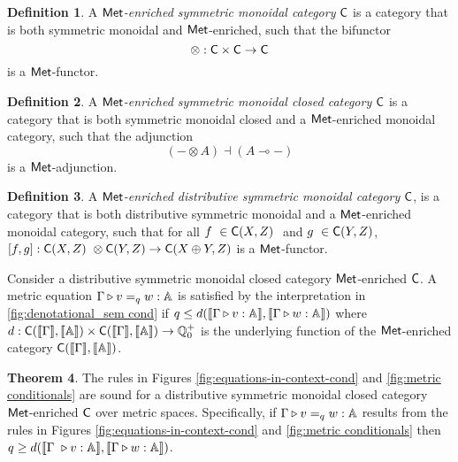 \documentclass[10pt,a4paper]{amsart}
\theoremstyle{definition}
\newtheorem{definition}{Definition}[section]
\theoremstyle{definition}
\theoremstyle{definition}
\theoremstyle{definition}
\theoremstyle{definition}
\theoremstyle{definition}
\newtheorem{theorem}[definition]{Theorem}
\begin{document}
\begin{definition}
A \emph{$\mathsf{Met}$-enriched symmetric monoidal category} $\mathsf{C}$ is a category that is both symmetric monoidal and $\mathsf{Met}$-enriched, such that the bifunctor
\[
\otimes : \mathsf{C} \times \mathsf{C} \to \mathsf{C}
\]
is a $\mathsf{Met}$-functor. 
\end{definition}

\begin{definition}
  A \emph{$\mathsf{Met}$-enriched symmetric monoidal closed category} $\mathsf{C}$ is a category that is both symmetric monoidal closed and a $\mathsf{Met}$-enriched monoidal category, such that the adjunction
\[
(- \otimes A) \dashv (A \multimap -)
\]
is a $\mathsf{Met}$-adjunction.
\end{definition}


\begin{definition}
  A  \emph{$\mathsf{Met}$-enriched distributive symmetric monoidal category} $\mathsf{C}$, is a category that is both distributive symmetric monoidal and a $\mathsf{Met}$-enriched monoidal category, such that for all $f  \in \catC(X,Z)  $ and $g  \in \catC(Y,Z) $, $ [f,g]:\catC(X,Z)  \otimes \catC(Y,Z) \rightarrow \catC(X \oplus Y,Z) $ is a $\mathsf{Met}$-functor.
 \end{definition}




Consider a distributive symmetric monoidal closed category $\mathsf{Met}$-enriched $\mathsf{C}$. A metric equation $\Gamma \triangleright v =_{q} w : \mathbb{A} $ is satisfied by the interpretation in \autoref{fig:denotational_sem cond} if $q \leq d( \llbracket \Gamma  \triangleright v : \mathbb{A} \rrbracket, \llbracket\Gamma \triangleright w : \mathbb{A} \rrbracket)$ where $d : \mathsf{C}(\llbracket \Gamma \rrbracket, \llbracket \mathbb{A} \rrbracket) \times \mathsf{C}(\llbracket \Gamma \rrbracket, \llbracket \mathbb{A} \rrbracket) \rightarrow \mathbb{Q}_0^+$ is the underlying function of the $\mathsf{Met}$-enriched category   $\mathsf{C}(\llbracket \Gamma \rrbracket, \llbracket \mathbb{A} \rrbracket)$.

\begin{theorem}
  The rules in Figures \ref{fig:equations-in-context-cond} and \ref{fig:metric conditionals} are sound for a  distributive symmetric monoidal closed category $\mathsf{Met}$-enriched $\mathsf{C}$ over metric spaces. Specifically, if $\Gamma \triangleright v =_{q} w : \mathbb{A} $ results from the rules in Figures \ref{fig:equations-in-context-cond} and \ref{fig:metric conditionals} then $q \geq d( \llbracket \Gamma  \vljud v : \typeA \rrbracket, \llbracket\Gamma \vljud w : \typeA \rrbracket)$.
\end{theorem}
\end{document}

